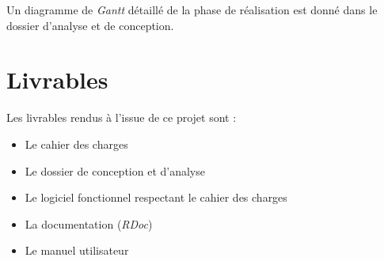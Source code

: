 \documentclass[a4paper, 12pt]{report}
\begin{document}
		Un diagramme de \textit{Gantt} détaillé de la phase de réalisation est donné dans le dossier d'analyse et de conception.


\chapter{Livrables}
\thispagestyle{empty}
\thispagestyle{plain}
\vspace*{0.5cm}
	Les livrables rendus à l'issue de ce projet sont :
	\begin{itemize}
	\item Le cahier des charges
	\item Le dossier de conception et d'analyse
	\item Le logiciel fonctionnel respectant le cahier des charges
	\item La documentation (\textit{RDoc})
	\item Le manuel utilisateur
	\end{itemize}
		
		
		
\end{document}
